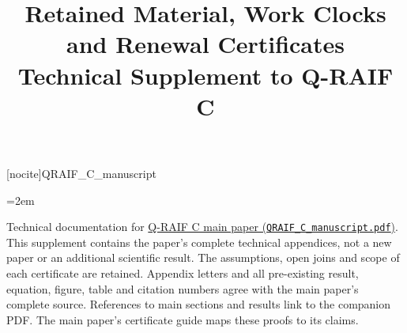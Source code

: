 
[nocite]{QRAIF_C_manuscript}
\title{Retained Material, Work Clocks and Renewal Certificates\\[4pt]\large Technical Supplement to Q-RAIF C}

\emergencystretch=2em
\raggedbottom
{}
\renewcommand{\thepage}{S\arabic{page}}
\maketitle
\noindent Technical documentation for \href{QRAIF_C_manuscript.pdf}{Q-RAIF C main paper (\texttt{QRAIF\_C\_manuscript.pdf})}. This supplement contains the paper's complete technical appendices, not a new paper or an additional scientific result. The assumptions, open joins and scope of each certificate are retained. Appendix letters and all pre-existing result, equation, figure, table and citation numbers agree with the main paper's complete source. References to main sections and results link to the companion PDF. The main paper's certificate guide maps these proofs to its claims.
\clearpage
\setcounter{theorem}{21}
\setcounter{equation}{34}
\setcounter{figure}{0}
\setcounter{table}{1}
\setcounter{footnote}{0}
\appendix



